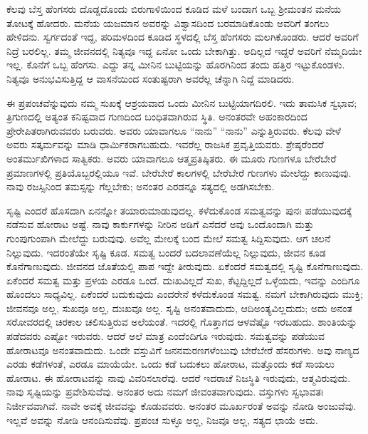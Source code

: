 ಕೆಲವು ಬೆಸ್ತ ಹೆಂಗಸರು ದೊಡ್ಡದೊಂದು ಬಿರುಗಾಳಿಯಿಂದ ಕೂಡಿದ ಮಳೆ ಬಂದಾಗ ಒಬ್ಬ ಶ‍್ರೀಮಂತನ ಮನೆಯ ತೋಟಕ್ಕೆ ಹೋದರು. ಮನೆಯ ಯಜಮಾನ ಅವರನ್ನು ವಿಶ್ವಾಸದಿಂದ ಬರಮಾಡಿಕೊಂಡು ಅವರಿಗೆ ತಂಗಲು ಹೇಳಿದನು. ಸ್ವರ್ಗದಂತೆ ಇದ್ದ, ಪರಿಮಳದಿಂದ ಕೂಡಿದ ಸ್ಥಳದಲ್ಲಿ ಬೆಸ್ತ ಹೆಂಗಸರು ಮಲಗಿಕೊಂಡರು. ಆದರೆ ಅವರಿಗೆ ನಿದ್ರೆ ಬರಲಿಲ್ಲ. ತಮ್ಮ ಜೀವನದಲ್ಲಿ ನಿತ್ಯವೂ ಇದ್ದ ಏನೋ ಒಂದು ಬೇಕಾಗಿತ್ತು. ಅದಿಲ್ಲದೆ ಇದ್ದರೆ ಅವರಿಗೆ ನೆಮ್ಮದಿಯೇ ಇಲ್ಲ. ಕೊನೆಗೆ ಒಬ್ಬ ಹೆಂಗಸು. ಎದ್ದು ತನ್ನ ಮೀನಿನ ಬುಟ್ಟಿಯನ್ನು ಹೊರಗಿನಿಂದ ತಂದು ಹತ್ತಿರ ಇಟ್ಟುಕೊಂಡಳು. ನಿತ್ಯವೂ ಅನುಭವಿಸುತ್ತಿದ್ದ ಆ ವಾಸನೆಯಿಂದ ಸಂತುಷ್ಟರಾಗಿ ಅವರೆಲ್ಲ ಚೆನ್ನಾಗಿ ನಿದ್ದೆ ಮಾಡಿದರು.

ಈ ಪ್ರಪಂಚವೆನ್ನುವುದು ನಮ್ಮ ಸುಖಕ್ಕೆ ಆಶ್ರಯವಾದ ಒಂದು ಮೀನಿನ ಬುಟ್ಟಿಯಾಗದಿರಲಿ. ಇದು ತಾಮಸಿಕ ಸ್ವಭಾವ; ತ್ರಿಗುಣದಲ್ಲಿ ಅತ್ಯಂತ ಕನಿಷ್ಟವಾದ ಗುಣದಿಂದ ಬಂಧಿತವಾಗಿರುವ ಸ್ಥಿತಿ. ಅನಂತರವೇ ಅಹಂಕಾರದಿಂದ ಪ್ರೇರೇಪಿತರಾಗಿರುವವರು ಬರುವರು. ಅವರು ಯಾವಾಗಲೂ “ನಾನು'' “ನಾನು'' ಎನ್ನುತ್ತಿರುವರು. ಕೆಲವು ವೇಳೆ ಅವರು ಸತ್ಕರ್ಮವನ್ನು ಮಾಡಿ ಧಾರ್ಮಿಕರಾಗಬಹುದು. ಇವರೆಲ್ಲ ರಾಜಸಿಕ ಪ್ರವೃತ್ತಿಯವರು. ಶ್ರೇಷ್ಠರೆಂದರೆ ಅಂತರ್ಮುಖಿಗಳಾದ ಸಾತ್ವಿಕರು. ಅವರು ಯಾವಾಗಲೂ ಆತ್ಮಪ್ರತಿಷ್ಠಿತರು. ಈ ಮೂರು ಗುಣಗಳೂ ಬೇರೆಬೇರೆ ಪ್ರಮಾಣಗಳಲ್ಲಿ ಪ್ರತಿಯೊಬ್ಬರಲ್ಲಿಯೂ ಇವೆ. ಬೇರೆಬೇರೆ ಕಾಲಗಳಲ್ಲಿ ಬೇರೆಬೇರೆ ಗುಣಗಳು ಮೇಲೆದ್ದು ಕಾಣುವುವು. ನಾವು ರಜಸ್ಸಿನಿಂದ ತಮಸ್ಸನ್ನು ಗೆಲ್ಲಬೇಕು; ಅನಂತರ ಎರಡನ್ನೂ ಸತ್ಯದಲ್ಲಿ ಅಡಗಿಸಬೇಕು.

ಸೃಷ್ಟಿ ಎಂದರೆ ಹೊಸದಾಗಿ ಏನನ್ನೋ ತಯಾರುಮಾಡುವುದಲ್ಲ. ಕಳೆದುಕೊಂಡ ಸಮತ್ವವನ್ನು ಪುನಃ ಪಡೆಯುವುದಕ್ಕೆ ನಡೆಸುವ ಹೋರಾಟ ಅಷ್ಟೆ. ನಾವು ಕಾರ್ಕುಗಳನ್ನು ನೀರಿನ ಅಡಿಗೆ ಎಸೆದರೆ ಅವು ಒಂದೊಂದಾಗಿ ಮತ್ತು ಗುಂಪುಗುಂಪಾಗಿ ಮೇಲೆದ್ದು ಬರುವುವು. ಅವೆಲ್ಲ ಮೇಲಕ್ಕೆ ಬಂದ ಮೇಲೆ ಸಮತ್ವ ಸಿದ್ದಿಸುವುದು. ಆಗ ಚಲನೆ ನಿಲ್ಲುವುದು. ಇದರಂತೆಯೇ ಸೃಷ್ಟಿ ಕೂಡ. ಸಮತ್ವ ಬಂದರೆ ಬದಲಾವಣೆಯೆಲ್ಲ ನಿಲ್ಲುವುದು, ಜೀವನ ಕೂಡ ಕೊನೆಗಾಣುವುದು. ಜೀವನದ ಜೊತೆಯಲ್ಲಿ ಪಾಪ ಇದ್ದೇ ತೀರುವುದು. ಏಕೆಂದರೆ ಸಮತ್ವದಲ್ಲಿ ಸೃಷ್ಟಿ ಕೊನೆಗಾಣುವುದು. ಏಕೆಂದರೆ ಸಮತ್ವ ಮತ್ತು ಪ್ರಳಯ ಎರಡೂ ಒಂದೆ. ದುಃಖವಿಲ್ಲದೆ ಸುಖ, ಕೆಟ್ಟದ್ದಿಲ್ಲದೆ ಒಳ್ಳೆಯದು, ಇವನ್ನು ಎಂದಿಗೂ ಹೊಂದಲು ಸಾಧ್ಯವಿಲ್ಲ. ಏಕೆಂದರೆ ಬದುಕುವುದು ಎಂದರೇನೆ ಕಳೆದುಕೊಂಡ ಸಮತ್ವ. ನಮಗೆ ಬೇಕಾಗಿರುವುದು ಮುಕ್ತಿ; ಜೀವನವೂ ಅಲ್ಲ, ಸುಖವೂ ಅಲ್ಲ, ದುಃಖವೂ ಅಲ್ಲ. ಸೃಷ್ಟಿ ಅನಂತವಾದುದು, ಆದಿಅಂತ್ಯವಿಲ್ಲದುದು; ಅದು ಅನಂತ ಸರೋವರದಲ್ಲಿ ಚಿರಕಾಲ ಚಲಿಸುತ್ತಿರುವ ಅಲೆಯಂತೆ. ಇದರಲ್ಲಿ ಗೊತ್ತಾಗದ ಆಳವೆಷ್ಟೊ ಇರಬಹುದು. ಶಾಂತಿಯನ್ನು ಪಡೆದವರು ಎಷ್ಟೋ ಇರುವರು. ಆದರೆ ಅಲೆ ಮಾತ್ರ ಎಂದೆಂದಿಗೂ ಇರುವುದು. ಸಮತ್ವವನ್ನು ಪಡೆಯುವ ಹೋರಾಟವೂ ಅನಂತವಾದುದು. ಒಂದೇ ವಸ್ತುವಿಗೆ ಜನನಮರಣಗಳೆಂಬುವು ಬೇರೆಬೇರೆ ಹೆಸರುಗಳು. ಅವು ನಾಣ್ಯದ ಎರಡು ಕಡೆಗಳಂತೆ, ಎರಡೂ ಮಾಯೆಯೇ. ಒಂದು ಕಡೆ ಬದುಕಲು ಹೋರಾಟ, ಮತ್ತೊಂದು ಕಡೆ ಸಾಯಲು ಹೋರಾಟ. ಈ ಹೋರಾಟವನ್ನು ನಾವು ವಿವರಿಸಲಾರೆವು. ಆದರೆ ಇದರಾಚೆ ನಿಜಸ್ಥಿತಿ ಇರುವುದು, ಆತ್ಮವಿರುವುದು. ನಾವು ಸೃಷ್ಟಿಯನ್ನು ಪ್ರವೇಶಿಸುವೆವು. ಅನಂತರ ಅದು ನಮಗೆ ಜೀವಂತವಾಗುವುದು. ವಸ್ತುಗಳು ಸ್ವಭಾವತಃ ನಿರ್ಜೀವವಾಗಿವೆ. ನಾವೇ ಅವಕ್ಕೆ ಜೀವವನ್ನು ಕೊಡುವವರು. ಅನಂತರ ಮೂರ್ಖರಂತೆ ಅವನ್ನು ನೋಡಿ ಅಂಜುವೆವು. ಇಲ್ಲವೆ ಅವನ್ನು ನೋಡಿ ಆನಂದಿಸುವೆವು. ಪ್ರಪಂಚ ಸುಳ್ಳೂ ಅಲ್ಲ, ನಿಜವೂ ಅಲ್ಲ, ಸತ್ಯದ ಛಾಯೆ ಅದು.

